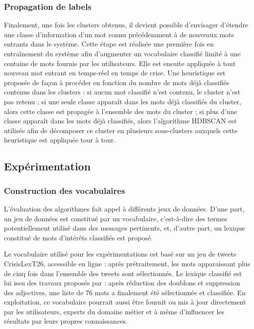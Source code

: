 \subsubsection*{Propagation de labels}

Finalement, une fois les clusters obtenus, il devient possible d'envisager d'étendre
une classe d'information d'un mot connu précédemment à de nouveaux mots
entrants dans le système. Cette étape est réalisée une première fois en entraînement
du système afin d'augmenter un vocabulaire classifié limité à une centaine de mots
fournis par les utilisateurs. Elle est ensuite appliquée à tout nouveau mot entrant
en temps-réel en temps de crise. Une heuristique est proposée de façon à procéder
en fonction du nombre de mots déjà classifiés contenus dans les clusters : si aucun
mot classifié n'est contenu, le cluster n'est pas retenu ; si une seule classe apparaît
dans les mots déjà classifiés du cluster, alors cette classe est propagée à l'ensemble
des mots du cluster ; si plus d'une classe apparaît dans les mots déjà classifiés, alors
l'algorithme HDBSCAN est utilisée afin de décomposer ce cluster en plusieurs
sous-clusters auxquels cette heuristique est appliquée tour à tour.

\subsection*{Expérimentation}
\subsubsection*{Construction des vocabulaires}

L'évaluation des algorithmes fait appel à différents jeux de données. D'une
part, un jeu de données est constitué par un vocabulaire, c'est-à-dire des termes
potentiellement utilisé dans des messages pertinents, et, d'autre part, un lexique
constitué de mots d'intérêts classifiés est proposé.

Le vocabulaire utilisé pour les expérimentations est basé sur un jeu de tweets
CrisisLexT26, accessible en ligne \textcite{olteanuWhatExpectWhen2015} : après prétraitement, les
mots apparaissant plus de cinq fois dans l'ensemble des tweets sont sélectionnés.
Le lexique classifié est lui issu des travaux proposés par \textcite{olteanuCrisisLexLexiconCollecting2014} : après réduction des doublons et suppression des adjectives, une liste de 76 mots a finalement été sélectionnée et classifiée.
En exploitation, ce vocabulaire pourrait aussi être fournit ou mis à jour directement par les utilisateurs, experts du domaine métier et à même d'influencer les résultats par leurs propres connaissances.

